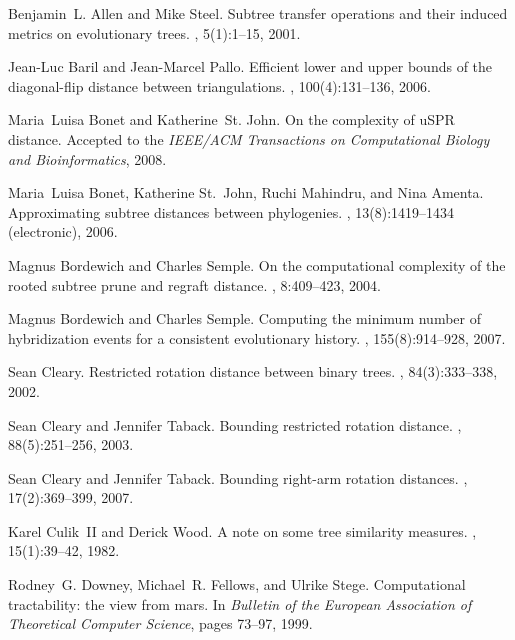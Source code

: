 \documentclass[12pt]{article}
\begin{document}
\small

\begin{thebibliography}{10}

Benjamin~L. Allen and Mike Steel.
\newblock Subtree transfer operations and their induced metrics on evolutionary
  trees.
, 5(1):1--15, 2001.

Jean-Luc Baril and Jean-Marcel Pallo.
\newblock Efficient lower and upper bounds of the diagonal-flip distance
  between triangulations.
, 100(4):131--136, 2006.

Maria~Luisa Bonet and Katherine~St. John.
\newblock On the complexity of {uSPR} distance.
\newblock Accepted to the {\em IEEE/ACM Transactions on Computational Biology
  and Bioinformatics}, 2008.

Maria~Luisa Bonet, Katherine St.~John, Ruchi Mahindru, and Nina Amenta.
\newblock Approximating subtree distances between phylogenies.
, 13(8):1419--1434
  (electronic), 2006.

Magnus Bordewich and Charles Semple.
\newblock On the computational complexity of the rooted subtree prune and
  regraft distance.
, 8:409--423, 2004.

Magnus Bordewich and Charles Semple.
\newblock Computing the minimum number of hybridization events for a consistent
  evolutionary history.
, 155(8):914--928, 2007.

Sean Cleary.
\newblock Restricted rotation distance between binary trees.
, 84(3):333--338, 2002.

Sean Cleary and Jennifer Taback.
\newblock Bounding restricted rotation distance.
, 88(5):251--256, 2003.

Sean Cleary and Jennifer Taback.
\newblock Bounding right-arm rotation distances.
,
  17(2):369--399, 2007.

Karel Culik~II and Derick Wood.
\newblock A note on some tree similarity measures.
, 15(1):39--42, 1982.

Rodney~G. Downey, Michael~R. Fellows, and Ulrike Stege.
\newblock Computational tractability: the view from mars.
\newblock In {\em Bulletin of the European Association of Theoretical Computer
  Science}, pages 73--97, 1999.


\end{thebibliography}
\end{document}
